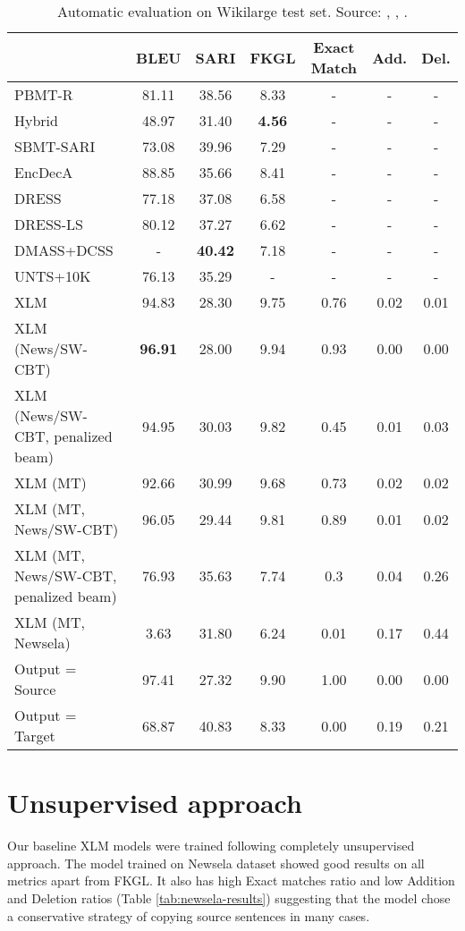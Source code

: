 \begin{table}
\centering
\begin{tabular}{m{4.5cm}cccccc}
\hline
\textbf{} & \textbf{BLEU} & \textbf{SARI} & \textbf{FKGL} & \textbf{Exact Match} & \textbf{Add.} & \textbf{Del.} \\
\hline
PBMT-R & 81.11 & 38.56 & 8.33 & - & - & - \\
Hybrid & 48.97 & 31.40 & \textbf{4.56} & - & - & - \\
SBMT-SARI & 73.08 & 39.96 & 7.29 & - & - & - \\
EncDecA & 88.85 & 35.66 & 8.41 & - & - & - \\
DRESS & 77.18 & 37.08 & 6.58 & - & - & - \\
DRESS-LS & 80.12 & 37.27 & 6.62 & - & - & - \\
DMASS+DCSS  & - & \textbf{40.42} & 7.18 & - & - & - \\
UNTS+10K & 76.13 & 35.29 & - & - & - & - \\
XLM & 94.83 & 28.30 & 9.75 & 0.76 & 0.02 & 0.01 \\
XLM (News/SW-CBT) & \textbf{96.91} & 28.00 & 9.94 & 0.93 & 0.00 & 0.00 \\
XLM (News/SW-CBT, penalized beam) & 94.95 & 30.03 & 9.82 & 0.45 & 0.01 & 0.03 \\
XLM (MT) & 92.66 & 30.99 & 9.68 & 0.73 & 0.02 & 0.02 \\
XLM (MT, News/SW-CBT) & 96.05 & 29.44 & 9.81 & 0.89 & 0.01 & 0.02 \\
XLM (MT, News/SW-CBT, penalized beam) & 76.93 & 35.63 & 7.74 & 0.3 & 0.04 & 0.26 \\
XLM (MT, Newsela) & 3.63 & 31.80 & 6.24 & 0.01 & 0.17 & 0.44 \\
\hline
Output = Source & 97.41 & 27.32 & 9.90 & 1.00 & 0.00 & 0.00 \\
Output = Target & 68.87 & 40.83 & 8.33 & 0.00 & 0.19 & 0.21 \\
\end{tabular}
\caption{Automatic evaluation on Wikilarge test set. Source: \cite{zhang-lapata-2017-sentence}, \cite{zhao2018integrating}, \cite{surya-etal-2019-unsupervised}.}
\label{tab:wikilarge-results}
\end{table}

\section{Unsupervised approach}

Our baseline XLM models were trained following completely unsupervised approach. The model trained on Newsela dataset showed good results on all metrics apart from FKGL. It also has high Exact matches ratio and low Addition and Deletion ratios (Table \ref{tab:newsela-results}) suggesting that the model chose a conservative strategy of copying source sentences in many cases. 

